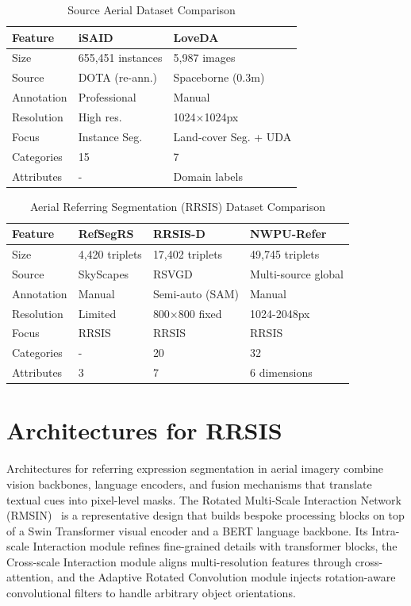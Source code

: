 \begin{table}[t]
\centering
\caption{Source Aerial Dataset Comparison}
\label{tab:source_comparison}
\begin{tabular}{@{}lll@{}}
\toprule
\textbf{Feature} & \textbf{iSAID} & \textbf{LoveDA} \\
\midrule
Size & 655,451 instances & 5,987 images \\
Source & DOTA (re-ann.) & Spaceborne (0.3m) \\
Annotation & Professional & Manual \\
Resolution & High res. & 1024×1024px \\
Focus & Instance Seg. & Land-cover Seg. + UDA \\
Categories & 15 & 7 \\
Attributes & - & Domain labels \\
\bottomrule
\end{tabular}
\end{table}

\begin{table}[t]
\centering
\caption{Aerial Referring Segmentation (RRSIS) Dataset Comparison}
\label{tab:rrsis_comparison}
\begin{tabular}{@{}llll@{}}
\toprule
\textbf{Feature} & \textbf{RefSegRS} & \textbf{RRSIS-D} & \textbf{NWPU-Refer} \\
\midrule
Size & 4,420 triplets & 17,402 triplets & 49,745 triplets \\
Source & SkyScapes & RSVGD & Multi-source global \\
Annotation & Manual & Semi-auto (SAM) & Manual \\
Resolution & Limited & 800×800 fixed & 1024-2048px \\
Focus & RRSIS & RRSIS & RRSIS \\
Categories & - & 20 & 32 \\
Attributes & 3 & 7 & 6 dimensions \\
\bottomrule
\end{tabular}
\end{table}


\section{Architectures for RRSIS}

Architectures for referring expression segmentation in aerial imagery combine vision backbones, language encoders, and fusion mechanisms that translate textual cues into pixel-level masks. The Rotated Multi-Scale Interaction Network (RMSIN)~\cite{liu2024rotated} is a representative design that builds bespoke processing blocks on top of a Swin Transformer visual encoder and a BERT language backbone. Its Intra-scale Interaction module refines fine-grained details with transformer blocks, the Cross-scale Interaction module aligns multi-resolution features through cross-attention, and the Adaptive Rotated Convolution module injects rotation-aware convolutional filters to handle arbitrary object orientations.

